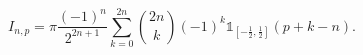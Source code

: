 \documentclass[11pt,oneside,reqno]{article}
\theoremstyle{definition}
\begin{document}
\begin{equation}
\label{InpFourier}
I_{n,p}=\pi \frac{\left(-1\right)^{n}}{2^{2n+1}}\sum_{k=0}^{2n}\binom{2n}{k}
\left(-1\right)^{k}
\mathds{1}_{\left[-\frac{1}{2},\frac{1}{2}\right]}(p+k-n).
\end{equation}

\end{document}
